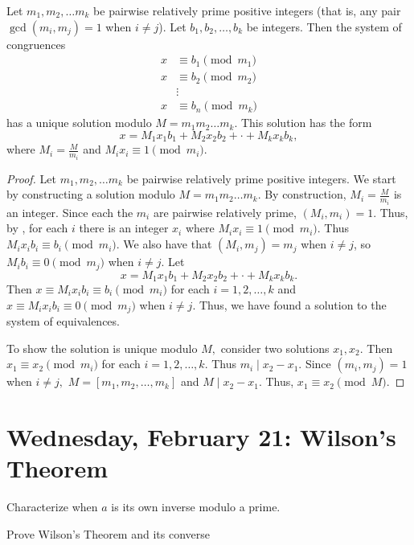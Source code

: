 \documentclass[letterpaper, 11 pt]{ximera}
\begin{document}
\begin{thm*}\label{CRT}
    Let $m_1,m_2,\dots m_k$ be pairwise relatively prime positive integers (that is, any pair $\gcd(m_i,m_j)=1$ when $i\neq j$). Let $b_1, b_2,\dots, b_k$ be integers. Then the system of congruences 
   \begin{align*}
    x&\equiv b_1 \pmod{m_1}\\
    x&\equiv b_2 \pmod{m_2}\\
       &\vdots\\
     x&\equiv b_n \pmod{m_k}
   \end{align*}
   has a unique solution modulo $M=m_1m_2\dots m_k$. This solution has the form 
   \[x=M_1x_1b_1+M_2x_2b_2+\cdot+M_kx_kb_k,\] where $M_i=\frac{M}{m_i}$ and $M_i x_i\equiv 1 \pmod{m_i}$.
   \end{thm*}
   \begin{proof} Let $m_1,m_2,\dots m_k$ be pairwise relatively prime positive integers.
    We start by constructing a solution modulo $M=m_1m_2\dots m_k$. By construction, $M_i=\frac{M}{m_i}$ is an integer. Since each the $m_i$ are pairwise relatively prime, $\left(M_i, m_i\right)=1$. Thus, by , for each $i$ there is an integer $x_i$ where $M_i x_i\equiv 1 \pmod{m_i}$. Thus $M_i x_i b_i\equiv b_i\pmod{m_i}$. We also have that $(M_i, m_j)=m_j$ when $i\neq j$, so $M_i b_i\equiv 0 \pmod{m_j}$ when $i\neq j$.  Let 
    \[x=M_1x_1b_1+M_2x_2b_2+\cdot+M_kx_kb_k.\] 
    Then $x\equiv M_i x_i b_i\equiv b_i\pmod{m_i}$ for each $i=1,2,\dots,k$ and $x\equiv M_i x_i b_i\equiv 0\pmod{m_j}$ when $i\neq j.$ Thus, we have found a solution to the system of equivalences.
    
    To show the solution is unique modulo $M,$ consider two solutions $x_1,x_2.$ Then $x_1\equiv x_2\pmod{m_i}$ for each $i=1,2,\dots,k.$ Thus $m_i\mid x_2-x_1$. Since $(m_i,m_j)=1$ when $i\neq j,$ $M=[m_1,m_2,\dots,m_k]$ and $M\mid x_2-x_1.$ Thus, $x_1\equiv x_2\pmod M.$ 
   \end{proof}
   

\section{Wednesday, February 21: Wilson's Theorem}

\begin{obj}
    \item Characterize when $a$ is its own inverse modulo a prime.

    \item Prove Wilson's Theorem and its converse
\end{obj}
\end{document}
